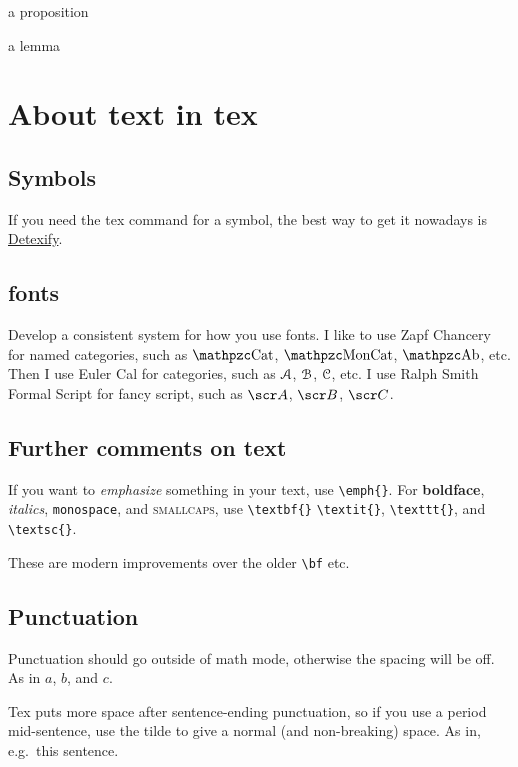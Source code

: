 \documentclass[11pt,oneside,draft]{amsart}
\begin{document}
\begin{prop}\label{prop:foo}
  a proposition
\end{prop}

\begin{lem}\label{lem:foo}
  a lemma
\end{lem}



\section{About text in tex}

\subsection{Symbols}

If you need the tex command for a symbol, the best way to get it
nowadays is
\href{http://detexify.kirelabs.org/classify.html}{Detexify}.

\subsection{fonts}

Develop a consistent system for how you use fonts.  I like to use Zapf
Chancery for named categories, such as $\Cat$, $\MonCat$, $\Ab$, etc.
Then I use Euler Cal for categories, such as $\mathcal{A}$, $\mathcal{B}$, $\mathcal{C}$,
etc.  I use Ralph Smith Formal Script for fancy script, such as $\sA$,
$\sB$, $\sC$.


\subsection{Further comments on text}

If you want to \emph{emphasize} something in your text, use
\verb|\emph{}|.  For \textbf{boldface}, \textit{italics},
\texttt{monospace}, and \textsc{smallcaps}, use \verb|\textbf{}|
\verb|\textit{}|, \verb|\texttt{}|, and \verb|\textsc{}|.

These are modern improvements over the older \verb|\bf| etc.

\subsection{Punctuation}

Punctuation should go outside of math mode, otherwise the spacing will
be off.  As in $a$, $b$, and $c$.

Tex puts more space after sentence-ending punctuation, so if you use a
period mid-sentence, use the tilde to give a normal (and non-breaking)
space.  As in, e.g.~this sentence.
\end{document}

